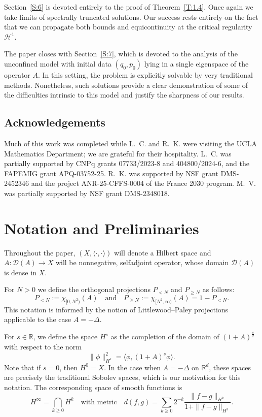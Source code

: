 \documentclass{amsart}
\newcommand{\R}{{\mathbb{R}}}
\newcommand{\qtq}[1]{\quad\text{#1}\quad}
\theoremstyle{definition}
\numberwithin{equation}{section}
\renewcommand{\H}{\mathcal H}
\newcommand{\la}{\langle}
\newcommand{\ra}{\rangle}
\begin{document}
Section~\ref{S:6} is devoted entirely to the proof of Theorem~\ref{T:1.4}.  Once again we take limits of spectrally truncated solutions.  Our success rests entirely on the fact that we can propagate both bounds and equicontinuity at the critical regularity $\H^1$.

The paper closes with Section~\ref{S:7}, which is devoted to the analysis of the unconfined model with initial data $(q_0,p_0)$ lying in a single eigenspace of the operator $A$.  In this setting, the problem is explicitly solvable by very traditional methods.  Nonetheless, such solutions provide a clear demonstration of some of the difficulties intrinsic to this model and justify the sharpness of our results.

\subsection*{Acknowledgements} Much of this work was completed while L.~C. and R.~K. were visiting the UCLA Mathematics Department; we are grateful for their hospitality.  L.~C. was partially supported by CNPq grants 07733/2023-8 and 404800/2024-6, and the FAPEMIG grant APQ-03752-25. R.~K. was supported by NSF grant DMS-2452346 and the project ANR-25-CFFS-0004 of the France 2030 program.  M.~V. was partially supported by NSF grant DMS-2348018.


\section{Notation and Preliminaries}\label{S:2}

Throughout the paper,  $(X, \la\cdot,\cdot\ra)$ will denote a Hilbert space and $A:\mathcal D(A) \to X$ will be nonnegative, selfadjoint operator, whose domain $\mathcal D(A)$ is dense in $X$.

For $N>0$ we define the orthogonal projections $P_{<N}$ and $P_{\geq N}$ as follows:
\begin{equation}\label{LP def}
P_{< N} := \chi_{[0,N^2)}(A) \qtq{and}  P_{\geq N}  := \chi_{[N^2, \infty)}(A)=1-P_{<N}.
\end{equation}
This notation is informed by the notion of Littlewood--Paley projections applicable to the case $A=-\Delta$.

For $s \in \R$, we define the space $H^s$ as the completion of the domain of $(1+A)^{\frac s2}$ with respect to the norm
\begin{equation}\label{H defn}
\|\phi\|_{ H^s}^2 = \la \phi, (1+A)^s\phi\ra.
\end{equation}
Note that if $s=0$, then $H^0=X$.  In the case when $A=-\Delta$ on $\R^d$, these spaces are precisely the traditional Sobolev spaces, which is our motivation for this notation.  The corresponding space of smooth functions is 
\begin{equation}\label{Hinfty}
H^{\infty} = \bigcap_{k\geq 0} H^k \qtq{with metric} d(f,g) = \sum_{k\geq 0} 2^{-k} \frac{\|f-g\|_{H^k}}{1 + \|f-g\|_{H^k}}.
\end{equation}
 
\end{document}
